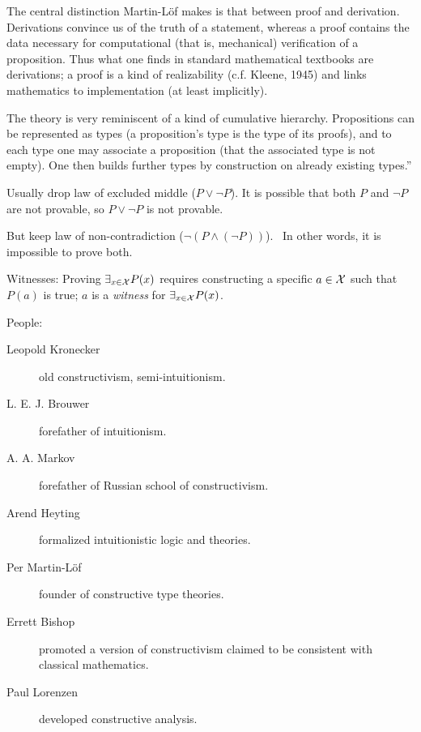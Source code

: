 The central distinction Martin-Löf makes is that 
between proof and derivation.
Derivations convince us of the truth of a statement, 
whereas a proof contains the data necessary for computational
(that is, mechanical) verification of a proposition. 
Thus what one finds in standard mathematical textbooks are
derivations; 
a proof is a kind of realizability (c.f. Kleene, 1945) and links
mathematics to implementation (at least implicitly).

The theory is very reminiscent of a kind of cumulative hierarchy. 
Propositions can be represented as types 
(a proposition's type is the type of its proofs),
and to each type one may associate a proposition 
(that the associated type is not empty). 
One then builds further types by construction on already existing
types.''

\label{sec:Constructivism_Wikipedia}

\cite{wiki:Constructivism_philosophy_of_mathematics}

Usually drop law of excluded middle 
($P \vee \lnot P$).\cite{wiki:Law_of_excluded_middle}
It is possible that both $P$ and $\lnot P$ are not provable,
so $P \vee \lnot P$ is not provable.

But keep law of non-contradiction
($\lnot ( P \wedge (\lnot P))$).~\cite{wiki:Law_of_noncontradiction}
In other words, it is impossible to prove both.

Witnesses: Proving $\exists _{x\in \mathcal{X}}P(x)$ requires
constructing a specific $a \in \mathcal{X}$ such that $P(a)$ is true; 
$a$ is a \textit{witness} for $\exists _{x\in \mathcal{X}}P(x)$.

People\cite{wiki:Constructivism_philosophy_of_mathematics}:
\begin{description}
\item[Leopold Kronecker] old constructivism, semi-intuitionism.
\item[L. E. J. Brouwer] forefather of intuitionism.
\item[A. A. Markov ] forefather of Russian school of constructivism.
\item[Arend Heyting] formalized intuitionistic logic and theories.
\item[Per Martin-Löf] founder of constructive type theories.
\item[Errett Bishop] promoted a version of constructivism 
claimed to be consistent with classical mathematics.
\item[Paul Lorenzen] developed constructive analysis.
\end{description}

